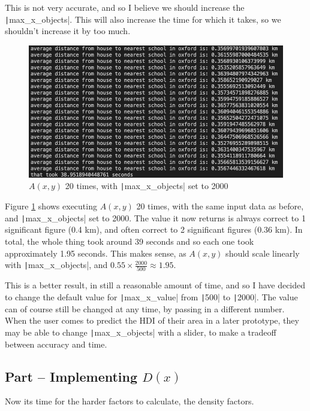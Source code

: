 \documentclass[12pt]{report}
\newcommand{\pil}[1]{\protect\texttt|#1|}
\begin{document}
This is not very accurate, and so I believe we should increase the \pil{max_x_objects}. This will also increase the time for which it takes, so we shouldn't increase it by too much.

\begin{figure}[H]
\centering
\includegraphics[width=14cm]{ss3.2.png}
\caption{$A\left(x,y\right)$ 20 times, with \pil{max_x_objects} set to 2000}\label{fig:ss3.2}
\end{figure}

Figure \ref{fig:ss3.2} shows executing $A\left(x,y\right)$ 20 times, with the same input data as before, and \pil{max_x_objects} set to 2000. The value it now returns is always correct to 1 significant figure (0.4 \unit{km}), and often correct to 2 significant figures (0.36 \unit{km}). In total, the whole thing took around 39 seconds and so each one took approximately 1.95 seconds. This makes sense, as $A\left(x,y\right)$ should scale linearly with \pil{max_x_objects}, and $0.55\times\frac{2000}{500}\approx 1.95$.

This is a better result, in still a reasonable amount of time, and so I have decided to change the default value for \pil{max_x_value} from \pil{500} to \pil{2000}. The value can of course still be changed at any time, by passing in a different number. When the user comes to predict the HDI of their area in a later prototype, they may be able to change \pil{max_x_objects} with a slider, to make a tradeoff between accuracy and time.

\subsection{Part \theparts{} -- Implementing $D\left(x\right)$}\label{sec:dofxImplementation}
Now its time for the harder factors to calculate, the density factors.
\end{document}
